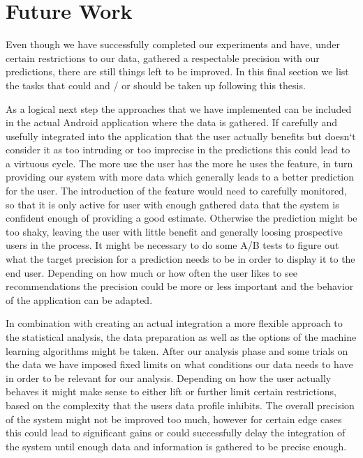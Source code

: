 \newpage
\section{Future Work}
\label{sec:future_work}

Even though we have successfully completed our experiments and have, under certain restrictions to our data, gathered a respectable precision with our predictions, there are still things left to be improved. In this final section we list the tasks that could and / or should be taken up following this thesis.

As a logical next step the approaches that we have implemented can be included in the actual Android application where the data is gathered. If carefully and usefully integrated into the application that the user actually benefits but doesn`t consider it as too intruding or too imprecise in the predictions this could lead to a virtuous cycle. The more use the user has the more he uses the feature, in turn providing our system with more data which generally leads to a better prediction for the user. The introduction of the feature would need to carefully monitored, so that it is only active for user with enough gathered data that the system is confident enough of providing a good estimate. Otherwise the prediction might be too shaky, leaving the user with little benefit and generally loosing prospective users in the process. It might be necessary to do some A/B tests to figure out what the target precision for a prediction needs to be in order to display it to the end user. Depending on how much or how often the user likes to see recommendations the precision could be more or less important and the behavior of the application can be adapted.

In combination with creating an actual integration a more flexible approach to the statistical analysis, the data preparation as well as the options of the machine learning algorithms might be taken. After our analysis phase and some trials on the data we have imposed fixed limits on what conditions our data needs to have in order to be relevant for our analysis. Depending on how the user actually behaves it might make sense to either lift or  further limit certain restrictions, based on the complexity that the users data profile inhibits. The overall precision of the system might not be improved too much, however for certain edge cases this could lead to significant gains or could successfully delay the integration of the system until enough data and information is gathered to be precise enough. 

